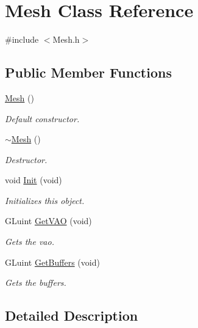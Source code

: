 \hypertarget{class_mesh}{}\section{Mesh Class Reference}
\label{class_mesh}




  




{\ttfamily \#include $<$Mesh.\+h$>$}

\subsection*{Public Member Functions}
\begin{DoxyCompactItemize}
\item 
\mbox{\hyperlink{class_mesh_a2af137f1571af89172b9c102302c416b}{Mesh}} ()
\begin{DoxyCompactList}\small\item\em Default constructor. \end{DoxyCompactList}\item 
\mbox{\hyperlink{class_mesh_a5efe4da1a4c0971cfb037bd70304c303}{$\sim$\+Mesh}} ()
\begin{DoxyCompactList}\small\item\em Destructor. \end{DoxyCompactList}\item 
void \mbox{\hyperlink{class_mesh_a02a9821c2034f01baf2a532d2488cde9}{Init}} (void)
\begin{DoxyCompactList}\small\item\em Initializes this object. \end{DoxyCompactList}\item 
G\+Luint \mbox{\hyperlink{class_mesh_a861cdeee95f6bbaf8d68392210a63e8b}{Get\+V\+AO}} (void)
\begin{DoxyCompactList}\small\item\em Gets the vao. \end{DoxyCompactList}\item 
G\+Luint \mbox{\hyperlink{class_mesh_a11a25c85c24c954d89ea0442c8b7b055}{Get\+Buffers}} (void)
\begin{DoxyCompactList}\small\item\em Gets the buffers. \end{DoxyCompactList}\end{DoxyCompactItemize}


\subsection{Detailed Description}


